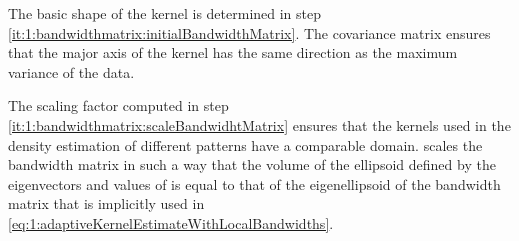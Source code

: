 		The basic shape of the kernel is determined in step \ref{it:1:bandwidthmatrix:initialBandwidthMatrix}. The covariance matrix ensures that the major axis of the kernel has the same direction as the maximum variance of the data.

		The scaling factor computed in step \ref{it:1:bandwidthmatrix:scaleBandwidhtMatrix} ensures that the kernels used in the density estimation of different patterns have a comparable domain.  scales the bandwidth matrix in such a way that the volume of the ellipsoid defined by the eigenvectors and values of \varBandwidthMatrix[\itXis] is equal to that of the eigenellipsoid of the bandwidth matrix that is implicitly used in \cref{eq:1:adaptiveKernelEstimateWithLocalBandwidths}. 